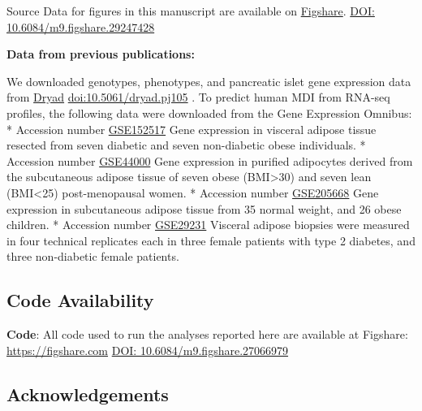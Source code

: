 \documentclass[
]{article}
\begin{document}
Source Data for figures in this manuscript are available on
\href{https://figshare.com/}{Figshare}.
\href{https://figshare.com/account/projects/251795/articles/29247428?file=55154321}{DOI:
10.6084/m9.figshare.29247428} \cite{tyler_2025}

\textbf{Data from previous publications:}

We downloaded genotypes, phenotypes, and pancreatic islet gene
expression data from \href{https://datadryad.org/}{Dryad}
\href{https://datadryad.org/dataset/doi:10.5061/dryad.pj105}{doi:10.5061/dryad.pj105}
\cite{DO_data}. To predict human MDI from RNA-seq profiles, the
following data were downloaded from the Gene Expression Omnibus: *
Accession number
\href{https://www.ncbi.nlm.nih.gov/geo/query/acc.cgi?acc=GSE152517}{GSE152517}
Gene expression in visceral adipose tissue resected from seven diabetic
and seven non-diabetic obese individuals. * Accession number
\href{https://www.ncbi.nlm.nih.gov/geo/query/acc.cgi?acc=GSE44000}{GSE44000}
Gene expression in purified adipocytes derived from the subcutaneous
adipose tissue of seven obese (BMI\textgreater30) and seven lean
(BMI\textless25) post-menopausal women. * Accession number
\href{https://www.ncbi.nlm.nih.gov/geo/query/acc.cgi?acc=GSE205668}{GSE205668}
Gene expression in subcutaneous adipose tissue from 35 normal weight,
and 26 obese children. * Accession number
\href{https://www.ncbi.nlm.nih.gov/geo/query/acc.cgi?acc=GSE29231}{GSE29231}
Visceral adipose biopsies were measured in four technical replicates
each in three female patients with type 2 diabetes, and three
non-diabetic female patients.

\subsection{Code Availability}\label{code-availability}

\textbf{Code}: All code used to run the analyses reported here are
available at Figshare: \url{https://figshare.com}
\href{https://figshare.com/articles/dataset/Data_and_code_for_High-Dimensional_Mediation_Analysis_HDMA_in_diversity_outbred_mice/27066979}{DOI:
10.6084/m9.figshare.27066979} \cite{cube_data}

\pagebreak




\subsection{Acknowledgements}\label{acknowledgements}
\end{document}
